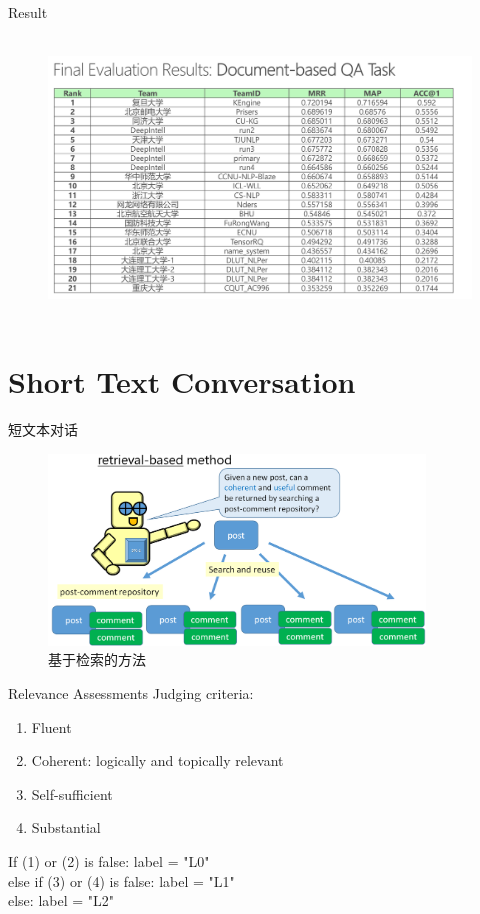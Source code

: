 \documentclass[aspectratio=169]{beamer} %
\begin{document}
  \begin{frame}{Result}
    \begin{center}
      \begin{figure}
      \includegraphics[width=13cm,height=7.45cm]{result-dbqa.png}
      \end{figure}
    \end{center}
  \end{frame}

  \section{Short Text Conversation}

    \begin{frame}{短文本对话}
      
      \begin{figure}
      \includegraphics[width=10cm,height=5.09cm]{stc2-ir-task.png}
      \caption{基于检索的方法}
      \end{figure}

    \end{frame}

    \begin{frame}{Relevance Assessments}
      Judging criteria:
      \begin{enumerate}
        \item Fluent
        \item Coherent: logically and topically relevant 
        \item Self-sufficient
        \item Substantial
      \end{enumerate}
      If (1) or (2) is false: label = "L0" \\
      else if (3) or (4) is false: label = "L1" \\
      else: label = "L2"
    \end{frame}
\end{document}
